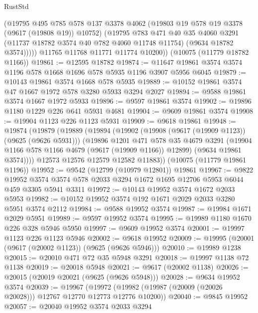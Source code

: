 \begin{lexlean}{RustStd}
\begin{coremodule}
{\begin{coremodule}
{{{{{{{{{{{{{{{{{{{{{{{{{{{{{{{{{            (@19795
              @495
              @785
              @578
              @137
              @3378
              @4062
              (@19803 @19 @578 @19 @3378 (@9617 (@19808 @19)) @10752)
              (@19795
                @783
                @471
                @40
                @35
                @4060
                @3291
                (@11737 @18782 @3574 @40 @782 @4060 @11748 @11754)
                (@9634 @18782 @3574)))))
        @11765
        @11768
        @11771
        @11774
        @10200))
    (@10075 (@11779 @18782 @1166))
@19861 := @12595 @18782
@19874 := @11647 @19861 @3574 @3574 @1196 @578 @1668 @1696 @578 @5935 @1196 @3907 @5956 @6045
@19879 := @10143 @19861 @3574 @1668 @578 @5935
@19889 := @10152 @19861 @3574 @47 @1667 @1972 @578 @3280 @5933 @3294 @2027
@19894 := @9588 @19861 @3574 @1667 @1972 @5933
@19896 := @9597 @19861 @3574
@19902 := @19896 @1180 @1229 @226 @641 @5931 @4681
@19904 := @9609 @19861 @3574
@19908 := @19904 @1123 @226 @1123 @5931
@19909 := @9618 @19861
@19948 := @19874
    (@19879
      (@19889
        (@19894
          (@19902
            (@19908 (@9617 (@19909 @1123)) (@9625 (@9626 @5931)))
            (@19896
              @1201
              @471
              @578
              @35
              @4679
              @3291
              (@19904 @1166 @578 @1166 @4679 (@9617 (@19909 @1166)) @12899)
              (@9634 @19861 @3574))))
        @12573
        @12576
        @12579
        @12582
        @11883))
    (@10075 (@11779 @19861 @1196))
@19952 := @9542 (@12799 (@10979 @12801)) @19861
@19967 := @9822
    @19952
    @3574
    @3574
    @578
    @2033
    @3294
    @1672
    @1695
    @12706
    @5953
    @6044
    @459
    @3305
    @5941
    @3311
@19972 := @10143 @19952 @3574 @1672 @2033 @5953
@19982 := @10152 @19952 @3574 @192 @1671 @2029 @2033 @3280 @5951 @3574 @2112
@19984 := @9588 @19952 @3574
@19987 := @19984 @1671 @2029 @5951
@19989 := @9597 @19952 @3574
@19995 := @19989 @1180 @1670 @226 @328 @5946 @5950
@19997 := @9609 @19952 @3574
@20001 := @19997 @1123 @226 @1123 @5946
@20002 := @9618 @19952
@20009 := @19995 (@20001 (@9617 (@20002 @1123)) (@9625 (@9626 @5946)))
@20010 := @19989 @1238
@20015 := @20010 @471 @72 @35 @5948 @3291
@20018 := @19997 @1138 @72 @1138
@20019 := @20018 @5948
@20021 := @9617 (@20002 @1138)
@20026 := @20015 (@20019 @20021 (@9625 (@9626 @5948)))
@20028 := @9634 @19952 @3574
@20039 := @19967
    (@19972 (@19982 (@19987 (@20009 (@20026 @20028))) @12767 @12770 @12773 @12776 @10200))
@20040 := @9845 @19952
@20057 := @20040
    @19952
    @3574
    @2033
    @3294
}}}}}}}}}}}}}}}}}}}}}}}}}}}}}}}}}
\end{coremodule}}
\end{coremodule}
\end{lexlean}
